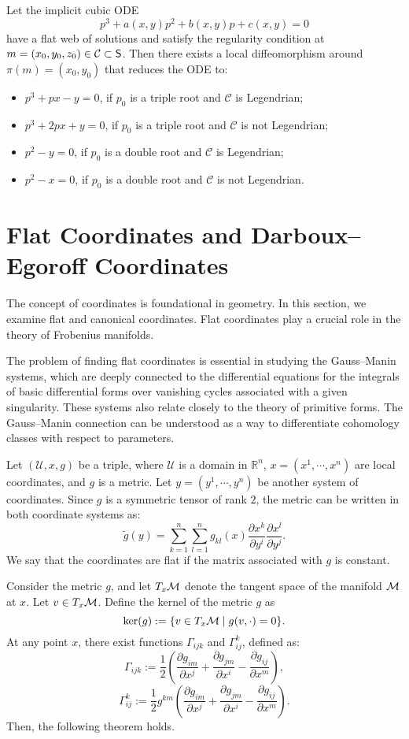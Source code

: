 \begin{theorem}\label{thm:flatweb2}
Let the implicit cubic ODE
\[
p^3 + a(x, y)p^2 + b(x, y)p + c(x, y) = 0
\]
have a flat web of solutions and satisfy the regularity condition at 
$m = (x_0, y_0, z_0) \in \mathcal{C} \subset \mathsf{S}$. Then there exists a local diffeomorphism around $\pi(m) = (x_0, y_0)$ that reduces the ODE to:
\begin{itemize}
    \item $p^3 + px - y = 0$, if $p_0$ is a triple root and $\mathcal{C}$ is Legendrian;
    \item $p^3 + 2px + y = 0$, if $p_0$ is a triple root and $\mathcal{C}$ is not Legendrian;
    \item $p^2 - y = 0$, if $p_0$ is a double root and $\mathcal{C}$ is Legendrian;
    \item $p^2 - x = 0$, if $p_0$ is a double root and $\mathcal{C}$ is not Legendrian.
\end{itemize}
\end{theorem}

\section{Flat Coordinates and Darboux--Egoroff Coordinates}
The concept of coordinates is foundational in geometry. In this section, we examine flat and canonical coordinates. Flat coordinates play a crucial role in the theory of Frobenius manifolds. 

The problem of finding flat coordinates is essential in studying the Gauss--Manin systems, which are deeply connected to the differential equations for the integrals of basic differential forms over vanishing cycles associated with a given singularity. These systems also relate closely to the theory of primitive forms. The Gauss--Manin connection can be understood as a way to differentiate cohomology classes with respect to parameters.

Let $(\mathcal{U}, x, g)$ be a triple, where $\mathcal{U}$ is a domain in $\mathbb{R}^n$, $x = (x^1, \cdots, x^n)$ are local coordinates, and $g$ is a metric. Let $y = (y^1, \cdots, y^n)$ be another system of coordinates. Since $g$ is a symmetric tensor of rank $2$, the metric can be written in both coordinate systems as:
\[
\tilde{g}(y) = \sum_{k=1}^n \sum_{l=1}^n g_{kl}(x) \frac{\partial x^k}{\partial y^i} \frac{\partial x^l}{\partial y^j}.
\]
We say that the coordinates are flat if the matrix associated with $g$ is constant.

Consider the metric $g$, and let $T_x \mathcal{M}$ denote the tangent space of the manifold $\mathcal{M}$ at $x$. Let $v \in T_x \mathcal{M}$. Define the kernel of the metric $g$ as
\[
\ker(g) := \{ v \in T_x \mathcal{M} \mid g(v, \cdot) = 0 \}.
\]
At any point $x$, there exist functions $\Gamma_{ijk}$ and $\Gamma_{ij}^k$, defined as:
\[
\Gamma_{ijk} := \frac{1}{2} \left( \frac{\partial g_{im}}{\partial x^j} + \frac{\partial g_{jm}}{\partial x^i} - \frac{\partial g_{ij}}{\partial x^m} \right),
\]
\[
\Gamma_{ij}^k := \frac{1}{2} g^{km} \left( \frac{\partial g_{im}}{\partial x^j} + \frac{\partial g_{jm}}{\partial x^i} - \frac{\partial g_{ij}}{\partial x^m} \right).
\]
Then, the following theorem holds.

